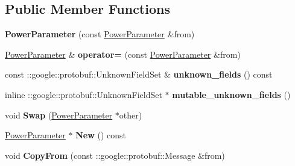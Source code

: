 \subsection*{Public Member Functions}
\begin{DoxyCompactItemize}
\item 
\mbox{\label{classcaffe_1_1_power_parameter_acc59856938e69855450548878cd5da4a}} 
{\bfseries Power\+Parameter} (const \mbox{\hyperlink{classcaffe_1_1_power_parameter}{Power\+Parameter}} \&from)
\item 
\mbox{\label{classcaffe_1_1_power_parameter_a358b457de880d96dc719f43f783d4f56}} 
\mbox{\hyperlink{classcaffe_1_1_power_parameter}{Power\+Parameter}} \& {\bfseries operator=} (const \mbox{\hyperlink{classcaffe_1_1_power_parameter}{Power\+Parameter}} \&from)
\item 
\mbox{\label{classcaffe_1_1_power_parameter_a00b3cee3a407ca7b4671beb9a31ac9bc}} 
const \+::google\+::protobuf\+::\+Unknown\+Field\+Set \& {\bfseries unknown\+\_\+fields} () const
\item 
\mbox{\label{classcaffe_1_1_power_parameter_a18539a26214c836c5696acdd86d7e6ef}} 
inline \+::google\+::protobuf\+::\+Unknown\+Field\+Set $\ast$ {\bfseries mutable\+\_\+unknown\+\_\+fields} ()
\item 
\mbox{\label{classcaffe_1_1_power_parameter_a57fa5991ae8d7b4f1ce869f9a5d9f8ab}} 
void {\bfseries Swap} (\mbox{\hyperlink{classcaffe_1_1_power_parameter}{Power\+Parameter}} $\ast$other)
\item 
\mbox{\label{classcaffe_1_1_power_parameter_ac160e73075e51c06f0c46927fc98366f}} 
\mbox{\hyperlink{classcaffe_1_1_power_parameter}{Power\+Parameter}} $\ast$ {\bfseries New} () const
\item 
\mbox{\label{classcaffe_1_1_power_parameter_a590b0b037681e68d83186271270b9a53}} 
void {\bfseries Copy\+From} (const \+::google\+::protobuf\+::\+Message \&from)
\item 
\mbox{\label{classcaffe_1_1_power_parameter_a963ccb77ab83f80f374a455bee969f5a}} 

\end{DoxyCompactItemize}

